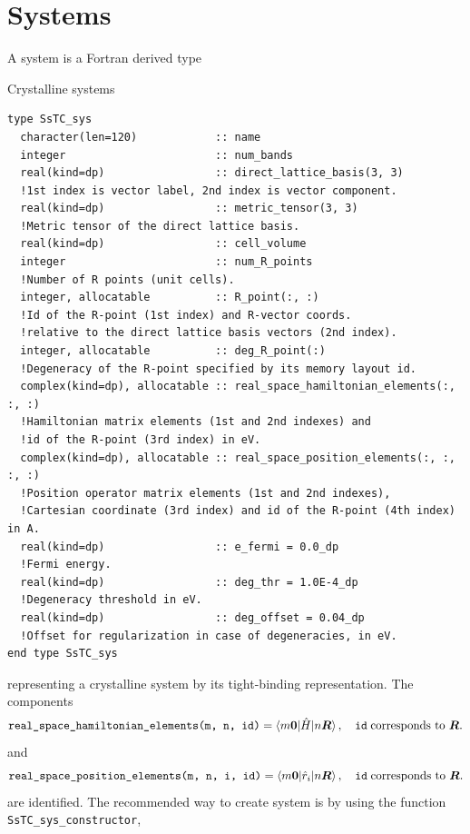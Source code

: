 \documentclass[10pt,a4paper]{article}
\begin{document}
\section{Systems}
A system is a Fortran derived type
\begin{codebox}{Crystalline systems}
\begin{lstlisting}[caption={Derived type corresponding to a system.},captionpos=b]
type SsTC_sys
  character(len=120)            :: name
  integer                       :: num_bands
  real(kind=dp)                 :: direct_lattice_basis(3, 3)
  !1st index is vector label, 2nd index is vector component.
  real(kind=dp)                 :: metric_tensor(3, 3)
  !Metric tensor of the direct lattice basis.
  real(kind=dp)                 :: cell_volume
  integer                       :: num_R_points
  !Number of R points (unit cells).
  integer, allocatable          :: R_point(:, :)
  !Id of the R-point (1st index) and R-vector coords.
  !relative to the direct lattice basis vectors (2nd index).
  integer, allocatable          :: deg_R_point(:)
  !Degeneracy of the R-point specified by its memory layout id.
  complex(kind=dp), allocatable :: real_space_hamiltonian_elements(:, :, :)
  !Hamiltonian matrix elements (1st and 2nd indexes) and
  !id of the R-point (3rd index) in eV.
  complex(kind=dp), allocatable :: real_space_position_elements(:, :, :, :)
  !Position operator matrix elements (1st and 2nd indexes),
  !Cartesian coordinate (3rd index) and id of the R-point (4th index) in A.
  real(kind=dp)                 :: e_fermi = 0.0_dp
  !Fermi energy.
  real(kind=dp)                 :: deg_thr = 1.0E-4_dp
  !Degeneracy threshold in eV.
  real(kind=dp)                 :: deg_offset = 0.04_dp
  !Offset for regularization in case of degeneracies, in eV.
end type SsTC_sys
\end{lstlisting}
\end{codebox}
representing a crystalline system by its tight-binding \cite{marzariMaximallyLocalizedWannier2012} representation. The components
\begin{equation}
\verb|real_space_hamiltonian_elements(m, n, id)| = \braket{m\bm{0}|\hat{H}|n\bm{R}},\quad \verb|id|\;\text{corresponds to }\bm{R}.
\end{equation}
and
\begin{equation}
\verb|real_space_position_elements(m, n, i, id)| = \braket{m\bm{0}|\hat{r}_i|n\bm{R}},\quad \verb|id|\;\text{corresponds to }\bm{R}.
\end{equation}
are identified.
The recommended way to create system is by using the function \verb|SsTC_sys_constructor|,
\end{document}
